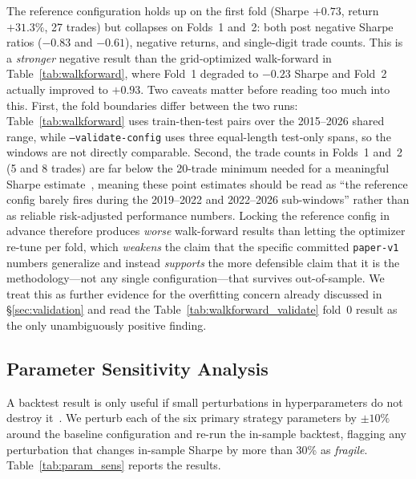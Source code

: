 \documentclass{article}
\begin{document}
The reference configuration holds up on the first fold (Sharpe $+0.73$, return $+31.3\%$, 27 trades) but collapses on Folds~1 and~2: both post negative Sharpe ratios ($-0.83$ and $-0.61$), negative returns, and single-digit trade counts.
This is a \emph{stronger} negative result than the grid-optimized walk-forward in Table~\ref{tab:walkforward}, where Fold~1 degraded to $-0.23$ Sharpe and Fold~2 actually improved to $+0.93$.
Two caveats matter before reading too much into this.
First, the fold boundaries differ between the two runs: Table~\ref{tab:walkforward} uses train-then-test pairs over the 2015--2026 shared range, while \texttt{--validate-config} uses three equal-length test-only spans, so the windows are not directly comparable.
Second, the trade counts in Folds~1 and~2 (5 and 8 trades) are far below the 20-trade minimum needed for a meaningful Sharpe estimate~\citep{lo2002statistics}, meaning these point estimates should be read as ``the reference config barely fires during the 2019--2022 and 2022--2026 sub-windows'' rather than as reliable risk-adjusted performance numbers.
Locking the reference config in advance therefore produces \emph{worse} walk-forward results than letting the optimizer re-tune per fold, which \emph{weakens} the claim that the specific committed \texttt{paper-v1} numbers generalize and instead \emph{supports} the more defensible claim that it is the methodology---not any single configuration---that survives out-of-sample.
We treat this as further evidence for the overfitting concern already discussed in \S\ref{sec:validation} and read the Table~\ref{tab:walkforward_validate} fold~0 result as the only unambiguously positive finding.

\subsection{Parameter Sensitivity Analysis}

A backtest result is only useful if small perturbations in hyperparameters do not destroy it~\citep{Harvey2015Backtesting}.
We perturb each of the six primary strategy parameters by $\pm 10\%$ around the baseline configuration and re-run the in-sample backtest, flagging any perturbation that changes in-sample Sharpe by more than 30\% as \emph{fragile}.
Table~\ref{tab:param_sens} reports the results.
\end{document}

